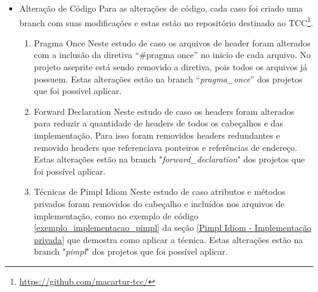 \begin{itemize}
    \item Alteração de Código
    \subitem
 Para as alterações de código, cada caso foi criado
 uma branch com suas modificações e estas estão no repositório
 destinado ao TCC\footnote{\url{https://github.com/macartur-tcc/}}.
    \begin{enumerate}
        \item Pragma Once
        \subitem Neste estudo de caso os arquivos de header foram alterados
 com a inclusão da diretiva “\#pragma once” no inicio de cada arquivo.
 No projeto aseprite está sendo removido a diretiva, pois todos os arquivos já possuem.
Estas alterações estão na branch “\textit{pragma\_once}” dos projetos que foi possível aplicar.
        \item Forward Declaration
        \subitem Neste estudo de caso os headers foram alterados para reduzir
 a quantidade de headers de todos os cabeçalhos e das implementação.
 Para isso foram removidos headers redundantes e removido headers que referenciava
 ponteiros e referências de endereço.
Estas alterações estão na branch "\textit{forward\_declaration}" dos projetos que foi possível aplicar.
        \item Técnicas de Pimpl Idiom
        \subitem Neste estudo de caso atributos e métodos privados foram removidos do cabeçalho
 e incluídos nos arquivos de implementação, como no exemplo de código \ref{exemplo_implementacao_pimpl}
 da seção \ref{Pimpl Idiom - Implementação privada}
 que demostra como aplicar a técnica.
Estas alterações estão na branch "\textit{pimpl}" dos projetos que foi possível aplicar.
    \end{enumerate}


\end{itemize}
